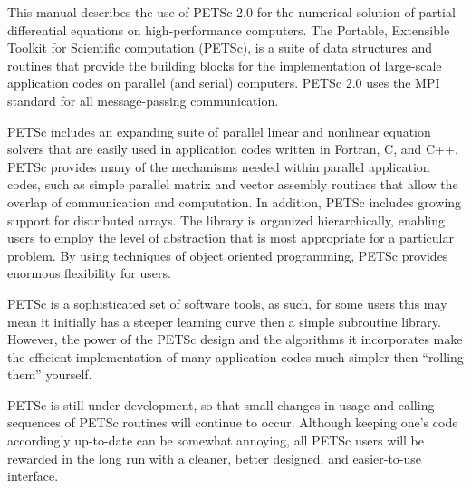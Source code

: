 

\medskip \medskip
This manual describes the use of PETSc 2.0 for the numerical solution
of partial differential equations on high-performance computers.  The
Portable, Extensible Toolkit for Scientific computation (PETSc), is a
suite of data structures and routines that provide the building
blocks for the implementation of large-scale application codes on parallel
(and serial) computers.  PETSc 2.0 uses the MPI standard for all
message-passing communication.

PETSc includes an expanding suite of parallel linear and nonlinear
equation solvers that are easily used in application codes written in
Fortran, C, and C++.  PETSc provides many of the mechanisms needed
within parallel application codes, such as simple parallel matrix and
vector assembly routines that allow the overlap of communication and
computation.  In addition, PETSc includes growing support for
distributed arrays.  The library is organized
hierarchically, enabling users to employ the level of abstraction that
is most appropriate for a particular problem. By using techniques 
of object oriented programming, PETSc provides enormous flexibility 
for users.

PETSc is a sophisticated set of software tools, as such, for some
users this may mean it initially has a steeper learning curve then a
simple subroutine library. However, the power of the PETSc design and
the algorithms it incorporates make the efficient implementation of
many application codes much simpler then ``rolling them'' yourself.

PETSc is still under development, so that small changes in usage and
calling sequences of PETSc routines will continue to occur.  Although
keeping one's code accordingly up-to-date can be somewhat annoying,
all PETSc users will be rewarded in the long run with a cleaner,
better designed, and easier-to-use interface.

